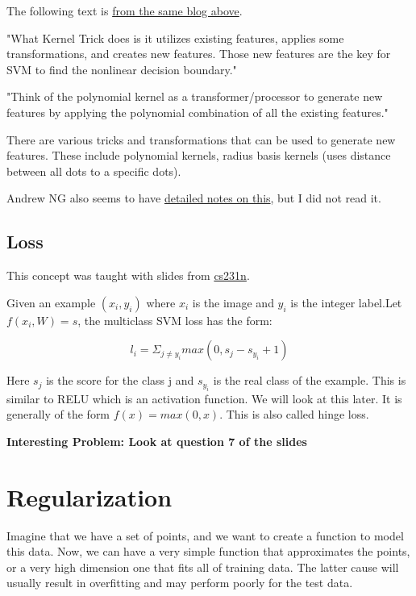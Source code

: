 The following text is \href{https://towardsdatascience.com/support-vector-machine-simply-explained-fee28eba5496}{from the same blog above}.

"What Kernel Trick does is it utilizes existing features, applies some transformations, and creates new features. Those new features are the key for SVM to find the nonlinear decision boundary."

"Think of the polynomial kernel as a transformer/processor to generate new features by applying the polynomial combination of all the existing features."

There are various tricks and transformations that can be used to generate new features. These include polynomial kernels, radius basis kernels (uses distance between all dots to a specific dots).

Andrew NG also seems to have \href{http://cs229.stanford.edu/notes/cs229-notes3.pdf}{detailed notes on this}, but I did not read it.

\subsection{Loss}

This concept was taught with slides from \href{http://cs231n.stanford.edu/slides/2020/lecture_3.pdf}{cs231n}. 

Given an example $(x_i, y_i)$ where $x_i$ is the image and $y_i$ is the integer label.Let $f(x_i, W) = s$, the multiclass SVM loss has the form:

\begin{equation}
    l_i = \Sigma_{j \neq y_i} max(0, s_j - s_{y_i} + 1)
\end{equation}

Here $s_j$ is the score for the class j and $s_{y_i}$ is the real class of the example. This is similar to RELU which is an activation function. We will look at this later. It is generally of the form $f(x) = max(0, x)$. This is also called hinge loss.

\textbf{Interesting Problem: Look at question 7 of the slides}

\section{Regularization}

Imagine that we have a set of points, and we want to create a function to model this data. Now, we can have a very simple function that approximates the points, or a very high dimension one that fits all of training data. The latter cause will usually result in overfitting and may perform poorly for the test data. 

